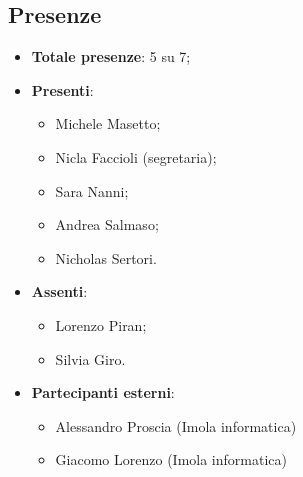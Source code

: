 \documentclass[11pt]{article}
\begin{document}
	\subsection{Presenze}
	\begin{itemize}
		\item \textbf{Totale presenze}: 5 su 7;
		\item \textbf{Presenti}:
		\begin{itemize}  
			\item Michele Masetto;
			\item Nicla Faccioli (segretaria);
			\item Sara Nanni;
			\item Andrea Salmaso;
			\item Nicholas Sertori.
		\end{itemize}
		\item \textbf{Assenti}:
			\begin{itemize}
				\item Lorenzo Piran;
				\item Silvia Giro.
			\end{itemize}
		\item \textbf{Partecipanti esterni}:
			\begin{itemize}
				\item Alessandro Proscia (Imola informatica)
				\item Giacomo Lorenzo (Imola informatica)
			\end{itemize}
	\end{itemize}

	\newpage
\end{document}
